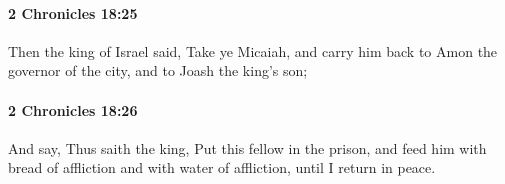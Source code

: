		\paragraph{2 Chronicles 18:25} %
			\label{2CHRONICLES-18-25}

			Then the king of Israel said, Take ye Micaiah, and carry him back to Amon the governor of the city, and to Joash the king's son;


		\paragraph{2 Chronicles 18:26} %
			\label{2CHRONICLES-18-26}

			And say, Thus saith the king, Put this fellow in the prison, and feed him with bread of affliction and with water of affliction, until I return in peace.


